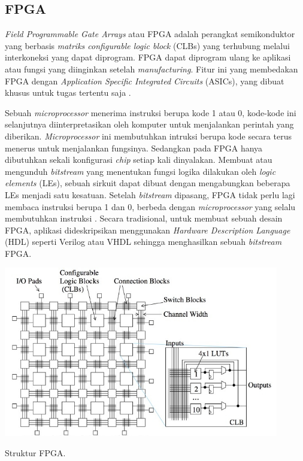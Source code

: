 \subsection{FPGA}
\textit{Field Programmable Gate Arrays} atau FPGA adalah perangkat semikonduktor yang berbasis \textit{matriks configurable logic block} (CLBs) yang terhubung melalui interkoneksi yang dapat diprogram. FPGA dapat diprogram ulang ke aplikasi atau fungsi yang diinginkan setelah \textit{manufacturing}. Fitur ini yang membedakan FPGA dengan \textit{Application Specific Integrated Circuits} (ASICs), yang dibuat khusus untuk tugas tertentu saja .

Sebuah \textit{microprocessor} menerima instruksi berupa kode 1 atau 0, kode-kode ini selanjutnya diinterpretasikan oleh komputer untuk menjalankan perintah yang diberikan. \textit{Microprocessor} ini membutuhkan intruksi berupa kode secara terus menerus untuk menjalankan fungsinya. Sedangkan pada FPGA hanya dibutuhkan sekali konfigurasi \textit{chip} setiap kali dinyalakan. Membuat atau mengunduh \textit{bitstream} yang menentukan fungsi logika dilakukan oleh \textit{logic elements} (LEs), sebuah sirkuit dapat dibuat dengan mengabungkan beberapa LEs menjadi satu kesatuan. Setelah \textit{bitstream} dipasang, FPGA tidak perlu lagi membaca instruksi berupa 1 dan 0, berbeda dengan \textit{microprocessor} yang selalu membutuhkan instruksi . Secara tradisional, untuk membuat sebuah desain FPGA, aplikasi dideskripsikan menggunakan \textit{Hardware Description Language} (HDL) seperti Verilog atau VHDL sehingga menghasilkan sebuah \textit{bitstream} FPGA. 

\begin{afigure}
    \includegraphics[width=12cm, center]{images/fpga-structure.jpeg}
    \caption{Struktur FPGA.}
    \label{fig:fpga-structure}
\end{afigure}

